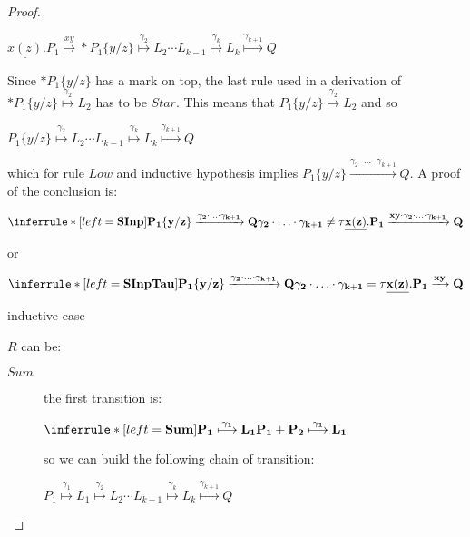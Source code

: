 \begin{proposition}
\begin{proof}
	    \begin{center}
	      $\underline{x(z)}.P_{1} \stackrel{xy}{\longmapsto} *P_{1}\{y/z\} \stackrel{\gamma_{2}}{\longmapsto} L_{2} \cdots L_{k-1} \stackrel{\gamma_{k}}{\longmapsto} L_{k} \stackrel{\gamma_{k+1}}{\longmapsto} Q$ 
	    \end{center}
	    Since $*P_{1}\{y/z\}$ has a mark on top, the last rule used in a derivation of $ *P_{1}\{y/z\} \stackrel{\gamma_{2}}{\longmapsto} L_{2}$ has to be $Star$. This means that $P_{1}\{y/z\} \stackrel{\gamma_{2}}{\longmapsto} L_{2}$ and so
	    \begin{center}
	      $P_{1}\{y/z\} \stackrel{\gamma_{2}}{\longmapsto} L_{2} \cdots L_{k-1} \stackrel{\gamma_{k}}{\longmapsto} L_{k} \stackrel{\gamma_{k+1}}{\longmapsto} Q$ 
	    \end{center} 
	    which for rule $Low$ and inductive hypothesis implies $P_{1}\{y/z\} \xrightarrow{\gamma_{2}\cdot \ldots \cdot \gamma_{k+1}} Q$. A proof of the conclusion is:
	    \begin{center}
	      $\inferrule* [left=\bf{SInp}]{
		  P_{1}\{y/z\} \xrightarrow{\gamma_{2}\cdot \ldots \cdot \gamma_{k+1}} Q
		\\
		  \gamma_{2}\cdot \ldots \cdot \gamma_{k+1} \neq \tau
	      }{
		\underline{x(z)}.P_{1} \xrightarrow{xy \cdot \gamma_{2}\cdot \ldots \cdot \gamma_{k+1}} Q
	      }$
	    \end{center}
	    or
	    \begin{center}
	      $\inferrule* [left=\bf{SInpTau}]{
		  P_{1}\{y/z\} \xrightarrow{\gamma_{2}\cdot \ldots \cdot \gamma_{k+1}} Q
		\\
		  \gamma_{2}\cdot \ldots \cdot \gamma_{k+1} = \tau
	      }{
		\underline{x(z)}.P_{1} \xrightarrow{xy} Q
	      }$
	    \end{center}
	\begin{description}
	  \item[inductive case] 
	\end{description}
	    $R$ can be:
	    \begin{description}
	      \item[$Sum$] the first transition is:
		\begin{center}
		  $\inferrule* [left=\bf{Sum}]{
		      P_{1} \stackrel{\gamma_{1}}{\longmapsto} L_{1}
		    }{
		      P_{1}+P_{2} \stackrel{\gamma_{1}}{\longmapsto} L_{1}
		  }$ 
		\end{center}
		so we can build the following chain of transition:
		\begin{center}
		  $P_{1} \stackrel{\gamma_{1}}{\longmapsto} L_{1} \stackrel{\gamma_{2}}{\longmapsto} L_{2} \cdots L_{k-1} \stackrel{\gamma_{k}}{\longmapsto} L_{k} \stackrel{\gamma_{k+1}}{\longmapsto} Q$ 

\end{center}
\end{description}
\end{proof}
\end{proposition}
